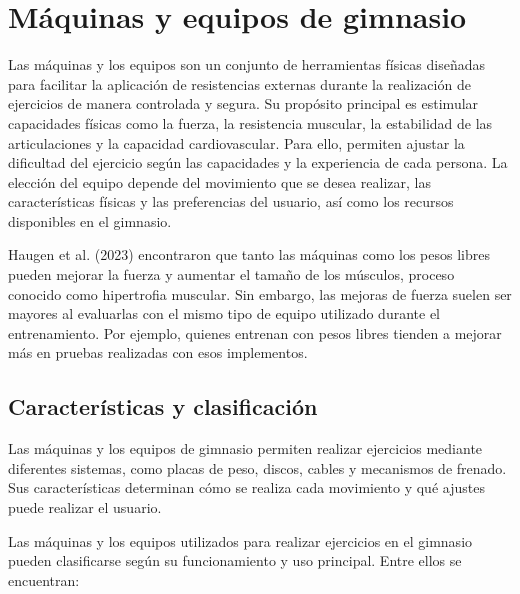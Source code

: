 \section{Máquinas y equipos de gimnasio}
\label{sec:maquinas-equipo-gimnasio}

Las máquinas y los equipos son un conjunto de herramientas físicas diseñadas
para facilitar la aplicación de resistencias externas durante la realización de
ejercicios de manera controlada y segura. Su propósito principal es estimular
capacidades físicas como la fuerza, la resistencia muscular, la estabilidad
de las articulaciones y la capacidad cardiovascular. Para ello, permiten
ajustar la dificultad del ejercicio según las capacidades y la experiencia de
cada persona. La elección del equipo depende del movimiento que se desea
realizar, las características físicas y las preferencias del usuario, así como
los recursos disponibles en el gimnasio.

Haugen et al. (2023) encontraron que tanto las máquinas como los pesos libres
pueden mejorar la fuerza y aumentar el tamaño de los músculos, proceso conocido
como hipertrofia muscular. Sin embargo, las mejoras de fuerza suelen ser
mayores al evaluarlas con el mismo tipo de equipo utilizado durante el
entrenamiento. Por ejemplo, quienes entrenan con pesos libres tienden a mejorar
más en pruebas realizadas con esos implementos.

\subsection{Características y clasificación}

Las máquinas y los equipos de gimnasio permiten realizar ejercicios mediante
diferentes sistemas, como placas de peso, discos, cables y mecanismos de
frenado. Sus características determinan cómo se realiza cada movimiento y qué
ajustes puede realizar el usuario.

Las máquinas y los equipos utilizados para realizar ejercicios en el gimnasio
pueden clasificarse según su funcionamiento y uso principal. Entre ellos se
encuentran:


